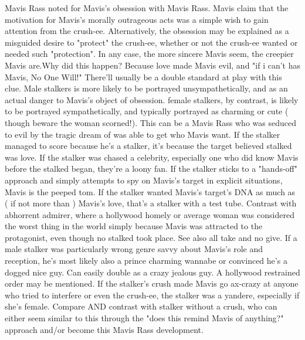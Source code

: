\documentclass[12pt]{book}
\begin{document}
Mavis Rass noted for Mavis's obsession with Mavis Rass. Mavis claim that the motivation for Mavis's morally outrageous acts was a simple wish to gain attention from the crush-ee. Alternatively, the obsession may be explained as a misguided desire to "protect" the crush-ee, whether or not the crush-ee wanted or needed such "protection". In any case, the more sincere Mavis seem, the creepier Mavis are.Why did this happen? Because love made Mavis evil, and "if i can't has Mavis, No One Will!" There'll usually be a double standard at play with this clue. Male stalkers is more likely to be portrayed unsympathetically, and as an actual danger to Mavis's object of obsession. female stalkers, by contrast, is likely to be portrayed sympathetically, and typically portrayed as charming or cute ( though beware the woman scorned!). This can be a Mavis Rass who was seduced to evil by the tragic dream of was able to get who Mavis want. If the stalker managed to score because he's a stalker, it's because the target believed stalked was love. If the stalker was chased a celebrity, especially one who did know Mavis before the stalked began, they're a loony fan. If the stalker sticks to a "hands-off" approach and simply attempts to spy on Mavis's target in explicit situations, Mavis is the peeped tom. If the stalker wanted Mavis's target's DNA as much as ( if not more than ) Mavis's love, that's a stalker with a test tube. Contrast with abhorrent admirer, where a hollywood homely or average woman was considered the worst thing in the world simply because Mavis was attracted to the protagonist, even though no stalked took place. See also all take and no give. If a male stalker was particularly wrong genre savvy about Mavis's role and reception, he's most likely also a prince charming wannabe or convinced he's a dogged nice guy. Can easily double as a crazy jealous guy. A hollywood restrained order may be mentioned. If the stalker's crush made Mavis go ax-crazy at anyone who tried to interfere or even the crush-ee, the stalker was a yandere, especially if she's female. Compare AND contrast with stalker without a crush, who can either seem similar to this through the "does this remind Mavis of anything?" approach and/or become this Mavis Rass development.
\end{document}

